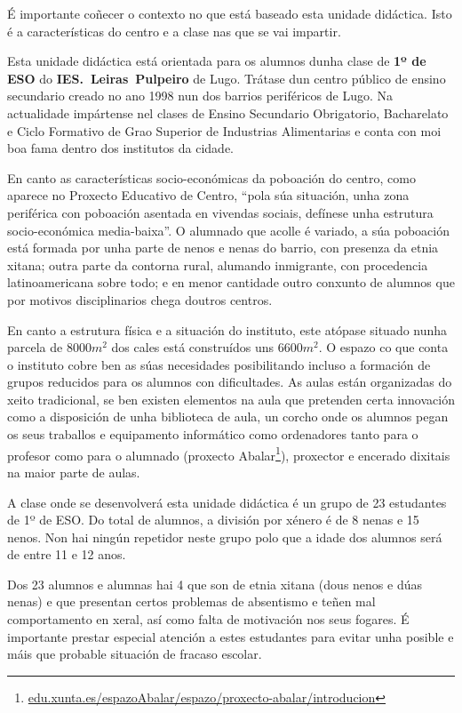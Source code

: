 
É importante coñecer o contexto no que está baseado esta unidade didáctica. Isto é a características do centro e a clase nas que se vai impartir.

Esta unidade didáctica está orientada para os alumnos dunha clase de \textbf{1º de ESO} do \textbf{IES.~Leiras~Pulpeiro} de Lugo. Trátase dun centro público de ensino secundario creado no ano 1998 nun dos barrios periféricos de Lugo. Na actualidade impártense nel clases de Ensino Secundario Obrigatorio, Bacharelato e Ciclo Formativo de Grao Superior de Industrias Alimentarias e conta con moi boa fama dentro dos institutos da cidade.

En canto as características socio-económicas da poboación do centro, como aparece no Proxecto Educativo de Centro, ``pola súa situación, unha zona periférica con poboación asentada en vivendas sociais, defínese unha estrutura socio-económica media-baixa''. O alumnado que acolle é variado, a súa poboación está formada por unha parte de nenos e nenas do barrio, con presenza da etnia xitana; outra parte da contorna rural, alumando inmigrante, con procedencia latinoamericana sobre todo; e en menor cantidade outro conxunto de alumnos que por motivos disciplinarios chega doutros centros.

En canto a estrutura física e a situación do instituto, este atópase situado nunha parcela de $8000 m^2$ dos cales está construídos uns $6600 m^2$. O espazo co que conta o instituto cobre ben as súas necesidades posibilitando incluso a formación de grupos reducidos para os alumnos con dificultades. As aulas están organizadas do xeito tradicional, se ben existen elementos na aula que pretenden certa innovación como a disposición de unha biblioteca de aula, un corcho onde os alumnos pegan os seus traballos e equipamento informático como ordenadores tanto para o profesor como para o alumnado (proxecto Abalar\footnote{\href{https://www.edu.xunta.es/espazoAbalar/espazo/proxecto-abalar/introducion}{edu.xunta.es/espazoAbalar/espazo/proxecto-abalar/introducion}}), proxector e encerado dixitais na maior parte de aulas.

A clase onde se desenvolverá esta unidade didáctica é un grupo de 23 estudantes de 1º de ESO. Do total de alumnos, a división por xénero é de 8 nenas e 15 nenos. Non hai ningún repetidor neste grupo polo que a idade dos alumnos será de entre 11 e 12 anos.

Dos 23 alumnos e alumnas hai 4 que son de etnia xitana (dous nenos e dúas nenas) e que presentan certos problemas de absentismo e teñen mal comportamento en xeral, así como falta de motivación nos seus fogares. É importante prestar especial atención a estes estudantes para evitar unha posible e máis que probable situación de fracaso escolar.

